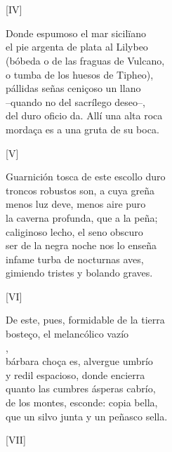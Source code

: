 \documentclass[11pt,a4paper,twoside]{article}
\begin{document}
\section*{\centering \fontsize{11}{14.35}\selectfont[FÁBVLA]}
\vspace{-1em}
\begin{center}
	[IV]
\end{center}
\pstart
Donde espumoso el mar sicilïano\\
el pie argenta de plata al Lilybeo\\
(bóbeda o de las fraguas de Vulcano,\\
o tumba de los huesos de Tipheo),\\
pállidas señas ceniçoso un llano\\
--quando no del sacrílego deseo--,\\
del duro oficio da. Allí una alta roca\\
mordaça es a una gruta de su boca.\pend
\begin{center}
	[V]
\end{center}
\pstart
Guarnición tosca de este escollo duro\\
troncos robustos son, a cuya greña\\
menos luz deve, menos aire puro\\
la caverna profunda, que a la peña;\\
caliginoso lecho, el seno obscuro\\
ser de la negra noche nos lo enseña\\
infame turba de nocturnas aves,\\
gimiendo tristes y bolando graves.\pend
\begin{center}
	[VI]
\end{center}\pstart
De este, pues, formidable de la tierra\\
bosteço, el melancólico vazío\\
,\\
bárbara choça es, alvergue umbrío\\
y redil espacioso, donde encierra\\
quanto las cumbres ásperas cabrío,\\
de los montes, esconde: copia bella,\\
que un silvo junta y un peñasco sella.\pend
\begin{center}
	[VII]
\end{center}\pstart
\end{document}
